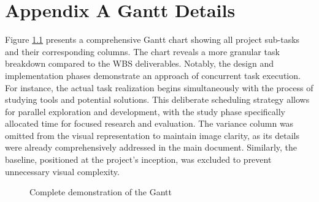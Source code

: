 
\chapter{Appendix A Gantt Details} %

\label{AppendixA} %


Figure \ref{fig:gantt_complete} presents a comprehensive Gantt chart showing all project sub-tasks and their corresponding columns. The chart reveals a more granular task breakdown compared to the \gls{WBS} deliverables. Notably, the design and implementation phases demonstrate an approach of concurrent task execution. For instance, the actual task realization begins simultaneously with the process of studying tools and potential solutions. This deliberate scheduling strategy allows for parallel exploration and development, with the study phase specifically allocated time for focused research and evaluation. The variance column was omitted from the visual representation to maintain image clarity, as its details were already comprehensively addressed in the main document. Similarly, the baseline, positioned at the project's inception, was excluded to prevent unnecessary visual complexity.

\begin{figure}
    \centering
    \caption{Complete demonstration of the Gantt}
    \label{fig:gantt_complete}
\end{figure}